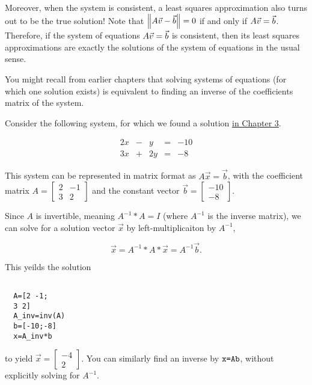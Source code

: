 \documentclass{ximera}
\begin{document}
Moreover, when the system is consistent, a least squares approximation also turns out to be the true solution! Note that $\left\|A\vec{v}-\vec{b}\right\|=0$ if and only if
$A\vec{v}=\vec{b}$. Therefore, if the system of equations
$A\vec{v}=\vec{b}$ is consistent, then its least squares
approximations are exactly the solutions of the system of equations in
the usual sense.

You might recall from earlier chapters that solving systems of equations (for which one solution exists) is equivalent to finding an inverse of the coefficients matrix of the system. 


Consider the following system, for which we found a solution \href{https://ximera.osu.edu/appliedlinearalgebra/c3ChapterThree/learningActivities/m3LearningActivities/modThreeSystems/matricesAreSystemsOfEquations3}{in Chapter 3}. 



$$\begin{matrix}
  2x& -&y&=&-10\\
  3x & +&2y&= &-8
\end{matrix}$$



This system can be represented in matrix format as $A\vec{x}=\vec{b}$, with the coefficient matrix $A=\begin{bmatrix}
  2 & -1\\ 3 & 2
\end{bmatrix}$ and the constant vector $\vec{b}=\begin{bmatrix}
  -10 \\-8
\end{bmatrix}$. 

Since $A$ is invertible, meaning $A^{-1}*A=I$ (where $A^{-1}$ is the inverse matrix), we can solve for a solution vector $\vec{x}$ by left-multiplicaiton by $A^{-1}$, 

$$\vec{x}=A^{-1}*A*\vec{x}=A^{-1}\vec{b}.$$

This yeilds the solution 



\begin{verbatim}
  
  A=[2 -1;
  3 2]
  A_inv=inv(A)
  b=[-10;-8]
  x=A_inv*b

\end{verbatim}


to yield $\vec{x}=\begin{bmatrix}
  -4\\2
\end{bmatrix}$. You can similarly find an inverse by $\texttt{x=A\\b}$, without explicitly solving for $A^{-1}$.
\end{document}
